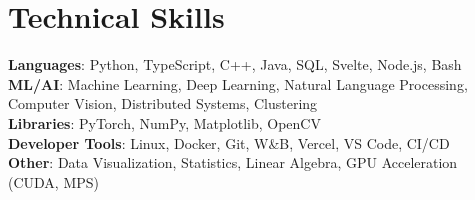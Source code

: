 \documentclass[letterpaper,11pt]{article}
\begin{document}
\section{Technical Skills}
 \begin{itemize}[leftmargin=0.15in, label={}]
    \small{\item{
     \textbf{Languages}{: Python, TypeScript, C++, Java, SQL, Svelte, Node.js, Bash} \\
     \textbf{ML/AI}{: Machine Learning, Deep Learning, Natural Language Processing, Computer Vision, Distributed Systems, Clustering} \\
     \textbf{Libraries}{: PyTorch, NumPy, Matplotlib, OpenCV} \\
     \textbf{Developer Tools}{: Linux, Docker, Git, W\&B, Vercel, VS Code, CI/CD} \\
     \textbf{Other}{: Data Visualization, Statistics, Linear Algebra, GPU Acceleration (CUDA, MPS)}
    }}
 \end{itemize}
\end{document}
